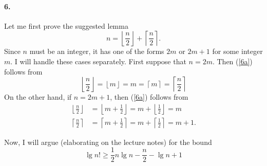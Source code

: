 \documentclass[
]{article}
\begin{document}
\paragraph{6.} Let me first prove the suggested lemma
\begin{equation}
  \label{6a}
  n = \left\lfloor \frac{n}{2}\right\rfloor + 
  \left\lceil \frac{n}{2}\right\rceil.
\end{equation}
Since $n$ must be an integer, it has one of the forms $2m$ or $2m+1$ for some integer $m$.  
I will handle these cases separately.
 First suppose that $n= 2m$.  
Then (\ref{6a}) follows from 
\begin{equation*}
  \left\lfloor \frac{n}{2}\right\rfloor = \left\lfloor m\right\rfloor = m = \left\lceil m\right\rceil = \left\lceil \frac{n}{2}\right\rceil
\end{equation*}
On the other hand, if $n = 2m+1$, then (\ref{6a}) follows from
\begin{align*}
\left\lfloor \frac{n}{2}\right\rfloor 
&= 
\left\lfloor m + \frac{1}{2}\right\rfloor 
=
m + \left\lfloor \frac{1}{2}\right\rfloor 
=
m
\\
\left\lceil \frac{n}{2}\right\rceil 
&= 
\left\lceil m + \frac{1}{2}\right\rceil
=
 m + \left\lceil\frac{1}{2}\right\rceil
=
m+1.
\end{align*}

Now, I will argue (elaborating on the lecture notes) for the bound
\begin{equation}
  \label{6}
  \lg n!\geq \frac{1}{2}n\lg n - \frac{n}{2} - \lg n + 1
\end{equation}
\end{document}
